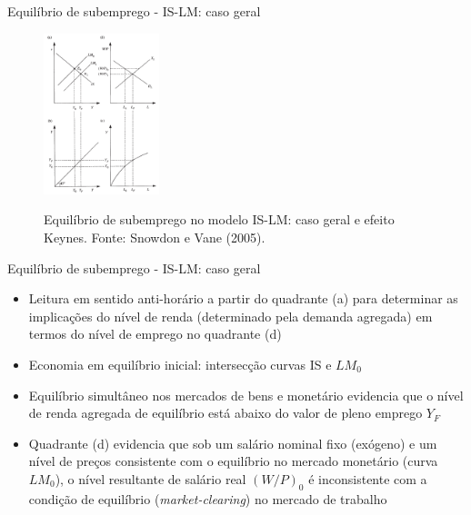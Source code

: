 \documentclass[10pt]{beamer}
\begin{document}
\begin{frame}{Equilíbrio de subemprego - IS-LM: caso geral}
    \begin{figure}
        \centering
        \href{https://raw.githubusercontent.com/pvfonseca/pec/main/notas/figures/aula7_fig1.PNG}{\includegraphics[width=0.3\textwidth]{./figures/aula7_fig1.PNG}}
        \caption{Equilíbrio de subemprego no modelo IS-LM: caso geral e efeito Keynes. Fonte: Snowdon e Vane (2005).}
        \label{fig1}
    \end{figure}
\end{frame}

\begin{frame}{Equilíbrio de subemprego - IS-LM: caso geral}
    \begin{itemize}
        \item Leitura em sentido anti-horário a partir do quadrante (a) para determinar as implicações do nível de renda (determinado pela demanda agregada) em termos do nível de emprego no quadrante (d)
        \bigskip
        \item Economia em equilíbrio inicial: intersecção curvas IS e $LM_0$
        \bigskip
        \item Equilíbrio simultâneo nos mercados de bens e monetário evidencia que o nível de renda agregada de equilíbrio está abaixo do valor de pleno emprego $Y_F$
        \bigskip
        \item Quadrante (d) evidencia que sob um salário nominal fixo (exógeno) e um nível de preços consistente com o equilíbrio no mercado monetário (curva $LM_0$), o nível resultante de salário real $(W/P)_0$ é inconsistente com a condição de equilíbrio (\emph{market-clearing}) no mercado de trabalho
    \end{itemize}
\end{frame}
\end{document}
